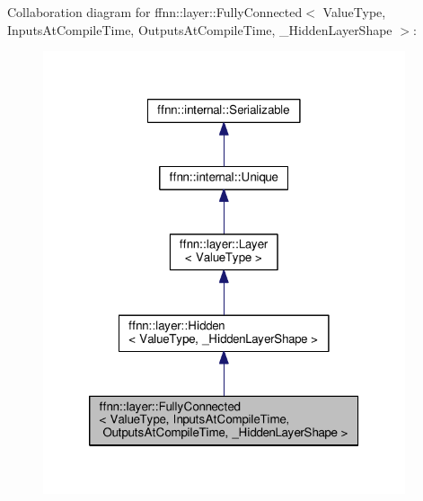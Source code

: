 Collaboration diagram for ffnn\-:\-:layer\-:\-:Fully\-Connected$<$ Value\-Type, Inputs\-At\-Compile\-Time, Outputs\-At\-Compile\-Time, \-\_\-\-Hidden\-Layer\-Shape $>$\-:\nopagebreak
\begin{figure}[H]
\begin{center}
\leavevmode
\includegraphics[width=302pt]{classffnn_1_1layer_1_1_fully_connected__coll__graph}
\end{center}
\end{figure}
